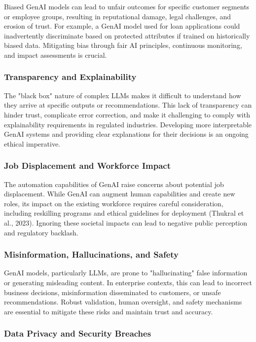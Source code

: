 \documentclass[10pt,twocolumn,letterpaper]{article}
\begin{document}
Biased GenAI models can lead to unfair outcomes for specific customer segments or employee groups, resulting in reputational damage, legal challenges, and erosion of trust. For example, a GenAI model used for loan applications could inadvertently discriminate based on protected attributes if trained on historically biased data. Mitigating bias through fair AI principles, continuous monitoring, and impact assessments is crucial.


\subsubsection{Transparency and Explainability}

The "black box" nature of complex LLMs makes it difficult to understand how they arrive at specific outputs or recommendations. This lack of transparency can hinder trust, complicate error correction, and make it challenging to comply with explainability requirements in regulated industries. Developing more interpretable GenAI systems and providing clear explanations for their decisions is an ongoing ethical imperative.


\subsubsection{Job Displacement and Workforce Impact}

The automation capabilities of GenAI raise concerns about potential job displacement. While GenAI can augment human capabilities and create new roles, its impact on the existing workforce requires careful consideration, including reskilling programs and ethical guidelines for deployment (Thukral et al., 2023). Ignoring these societal impacts can lead to negative public perception and regulatory backlash.


\subsubsection{Misinformation, Hallucinations, and Safety}

GenAI models, particularly LLMs, are prone to "hallucinating" false information or generating misleading content. In enterprise contexts, this can lead to incorrect business decisions, misinformation disseminated to customers, or unsafe recommendations. Robust validation, human oversight, and safety mechanisms are essential to mitigate these risks and maintain trust and accuracy.


\subsubsection{Data Privacy and Security Breaches}
\end{document}
